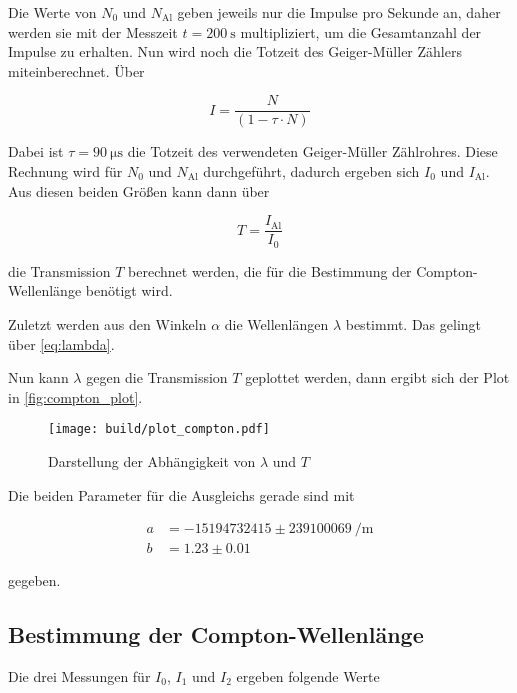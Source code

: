 Die Werte von $N_0$ und $N_\text{Al}$ geben jeweils nur die Impulse pro Sekunde an, daher werden sie mit der Messzeit $t = \SI{200}{\second}$ multipliziert, um die Gesamtanzahl der Impulse zu erhalten.
Nun wird noch die Totzeit des Geiger-Müller Zählers miteinberechnet. 
Über 

\begin{equation}
    I = \frac{N}{\left(1 - \tau \cdot N\right)}
    \label{eq:totzeit}
\end{equation}

Dabei ist $\tau = \SI{90}{\micro\second}$ die Totzeit des verwendeten Geiger-Müller Zählrohres.
Diese Rechnung wird für $N_0$ und $N_\text{Al}$ durchgeführt, dadurch ergeben sich $I_0$ und $I_\text{Al}$.
Aus diesen beiden Größen kann dann über 

\begin{equation}
    T = \frac{I_\text{Al}}{I_0}
\end{equation}

die Transmission $T$ berechnet werden, die für die Bestimmung der Compton-Wellenlänge benötigt wird.

Zuletzt werden aus den Winkeln $\alpha$ die Wellenlängen $\lambda$ bestimmt.
Das gelingt über \autoref{eq:lambda}.

Nun kann $\lambda$ gegen die Transmission $T$ geplottet werden, dann ergibt sich der Plot in \autoref{fig:compton_plot}.

\begin{figure}
    \centering
    \texttt{[image: build/plot\_compton.pdf]}
    \caption{Darstellung der Abhängigkeit von $\lambda$ und $T$}
    \label{fig:compton_plot}
\end{figure}

Die beiden Parameter für die Ausgleichs gerade sind mit 

\begin{align}
    a &= -15194732415 \pm \SI{239100069}{\per\meter} \label{eq:parameter1} \\
    b &= 1.23 \pm 0.01 \label{eq:parameter2}  
\end{align}

gegeben.

\subsection{Bestimmung der Compton-Wellenlänge}
\label{ssec:c}

Die drei Messungen für $I_0$, $I_1$ und $I_2$ ergeben folgende Werte

